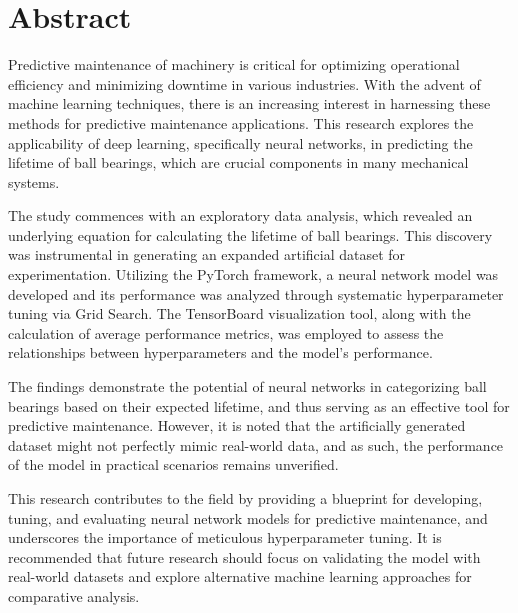 \chapter*{Abstract}

Predictive maintenance of machinery is critical for optimizing operational efficiency and minimizing downtime in various industries. With the advent of machine learning techniques, there is an increasing interest in harnessing these methods for predictive maintenance applications. This research explores the applicability of deep learning, specifically neural networks, in predicting the lifetime of ball bearings, which are crucial components in many mechanical systems. 
  
The study commences with an exploratory data analysis, which revealed an underlying equation for calculating the lifetime of ball bearings. This discovery was instrumental in generating an expanded artificial dataset for experimentation. Utilizing the PyTorch framework, a neural network model was developed and its performance was analyzed through systematic hyperparameter tuning via Grid Search. The TensorBoard visualization tool, along with the calculation of average performance metrics, was employed to assess the relationships between hyperparameters and the model's performance.
  
The findings demonstrate the potential of neural networks in categorizing ball bearings based on their expected lifetime, and thus serving as an effective tool for predictive maintenance. However, it is noted that the artificially generated dataset might not perfectly mimic real-world data, and as such, the performance of the model in practical scenarios remains unverified.
  
This research contributes to the field by providing a blueprint for developing, tuning, and evaluating neural network models for predictive maintenance, and underscores the importance of meticulous hyperparameter tuning. It is recommended that future research should focus on validating the model with real-world datasets and explore alternative machine learning approaches for comparative analysis.
